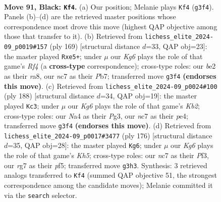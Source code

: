 \documentclass[11pt]{article}
\begin{document}
\clearpage

\begin{figure}[p]\centering
\begin{subfigure}{0.46\textwidth}\centering
\resizebox{\linewidth}{!}{%
\newchessgame
\chessboard[
  setfen={8/2N3R1/8/5P2/np2b1P1/6k1/4B3/5K2 b - - 5 91},
  showmover=false,
  pgfstyle=straightmove, color=movearrow, markmove={g3-f4}
]}
\caption{}
\end{subfigure}\hfill
\begin{subfigure}{0.46\textwidth}\centering
\resizebox{\linewidth}{!}{%
\newchessgame
\chessboard[
  setfen={R3K3/1p5R/3P4/P3Pr2/8/b2k4/8/8 b - - 0 85},
  showmover=false,
  pgfstyle=straightmove, color=movearrow, markmove={f5-e5}
]}
\caption{}
\end{subfigure}
\\[4pt]
\begin{subfigure}{0.46\textwidth}\centering
\resizebox{\linewidth}{!}{%
\newchessgame
\chessboard[
  setfen={2k5/8/2r1b3/Q1P2p2/4p3/6P1/1K6/8 w - - 77 95},
  showmover=false,
  pgfstyle=straightmove, color=movearrow, markmove={b2-c3}
]}
\caption{}
\end{subfigure}\hfill
\begin{subfigure}{0.46\textwidth}\centering
\resizebox{\linewidth}{!}{%
\newchessgame
\chessboard[
  setfen={2B5/8/3kp2p/5p1K/8/4bP2/8/8 w - - 3 89},
  showmover=false,
  pgfstyle=straightmove, color=movearrow, markmove={h5-g6}
]}
\caption{}
\end{subfigure}
\caption{\textbf{Move 91, Black: \texttt{Kf4}.} (a) Our position; Melanie plays \texttt{Kf4} (\texttt{g3f4}). Panels (b)--(d) are the retrieved master positions whose correspondence most drove this move (highest QAP objective among those that transfer to it). (b) Retrieved from \texttt{lichess\_elite\_2024-09\_p0019\#157} (ply 169) [structural distance $d$=33, QAP obj=23]: the master played \texttt{Rxe5+}; under $\mu$ our \emph{Kg6} plays the role of that game's \emph{Rf4} (a \textbf{cross-type} correspondence); cross-type roles: our \emph{b}e2 as their \emph{r}a8, our \emph{n}c7 as their \emph{P}b7; transferred move \texttt{g3f4} \textbf{(endorses this move)}. (c) Retrieved from \texttt{lichess\_elite\_2024-09\_p0024\#100} (ply 188) [structural distance $d$=34, QAP obj=19]: the master played \texttt{Kc3}; under $\mu$ our \emph{Kg6} plays the role of that game's \emph{Kb2}; cross-type roles: our \emph{N}a4 as their \emph{P}g3, our \emph{n}c7 as their \emph{p}e4; transferred move \texttt{g3f4} \textbf{(endorses this move)}. (d) Retrieved from \texttt{lichess\_elite\_2024-09\_p0017\#3477} (ply 176) [structural distance $d$=35, QAP obj=28]: the master played \texttt{Kg6}; under $\mu$ our \emph{Kg6} plays the role of that game's \emph{Kh5}; cross-type roles: our \emph{n}c7 as their \emph{P}f3, our \emph{r}g7 as their \emph{p}f5; transferred move \texttt{g3h3}. Synthesis: 3 retrieved analogs transferred to \texttt{Kf4} (summed QAP objective 51, the strongest correspondence among the candidate moves); Melanie committed it via the \texttt{search} selector.}
\label{fig:thought-m181}
\end{figure}
\end{document}
